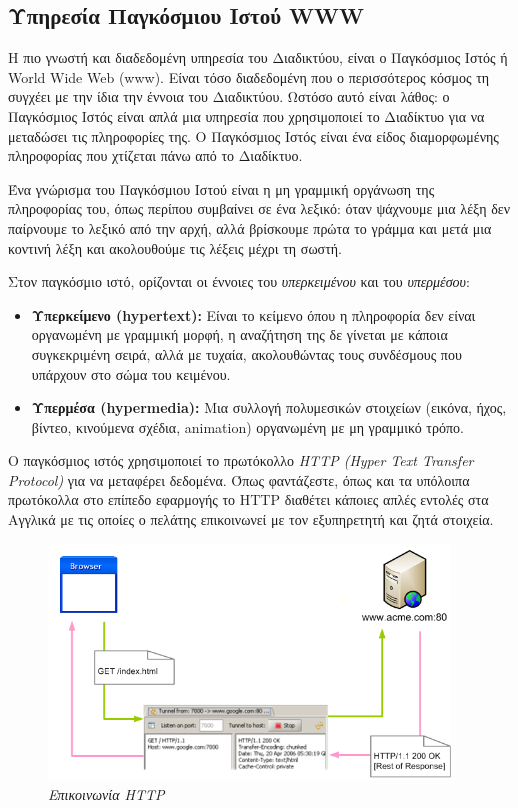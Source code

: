 %
%

\subsection{Υπηρεσία Παγκόσμιου Ιστού WWW}

Η πιο γνωστή και διαδεδομένη υπηρεσία του Διαδικτύου, είναι ο Παγκόσμιος Ιστός ή World Wide Web (www). Είναι τόσο διαδεδομένη που ο περισσότερος κόσμος τη συγχέει με την ίδια την έννοια του Διαδικτύου. Ωστόσο αυτό είναι λάθος: ο Παγκόσμιος Ιστός είναι απλά μια υπηρεσία που χρησιμοποιεί το Διαδίκτυο για να μεταδώσει τις πληροφορίες της. Ο Παγκόσμιος Ιστός είναι ένα είδος διαμορφωμένης πληροφορίας που χτίζεται πάνω από το Διαδίκτυο.

Ένα γνώρισμα του Παγκόσμιου Ιστού είναι η μη γραμμική οργάνωση της πληροφορίας του, όπως περίπου συμβαίνει σε ένα λεξικό: όταν ψάχνουμε μια λέξη δεν παίρνουμε το λεξικό από την αρχή, αλλά βρίσκουμε πρώτα το γράμμα και μετά μια κοντινή λέξη και ακολουθούμε τις λέξεις μέχρι τη σωστή.

Στον παγκόσμιο ιστό, ορίζονται οι έννοιες του \emph{υπερκειμένου} και του \emph{υπερμέσου}:

\begin{itemize}
\item \textbf{Υπερκείμενο (hypertext):} Είναι το κείμενο όπου  η πληροφορία δεν είναι οργανωμένη με γραμμική μορφή, η αναζήτηση της δε γίνεται με κάποια συγκεκριμένη σειρά, αλλά με τυχαία, ακολουθώντας τους συνδέσμους που υπάρχουν στο σώμα του κειμένου.
\item \textbf{Υπερμέσα (hypermedia):} Μια συλλογή πολυμεσικών στοιχείων (εικόνα, ήχος, βίντεο, κινούμενα σχέδια, animation) οργανωμένη με μη γραμμικό τρόπο.
\end{itemize}

Ο παγκόσμιος ιστός χρησιμοποιεί το πρωτόκολλο \emph{HTTP (Hyper Text Transfer Protocol)} για να μεταφέρει δεδομένα. Όπως φαντάζεστε, όπως και τα υπόλοιπα πρωτόκολλα στο επίπεδο εφαρμογής το HTTP διαθέτει κάποιες απλές εντολές στα Αγγλικά με τις οποίες ο πελάτης επικοινωνεί με τον εξυπηρετητή και ζητά στοιχεία.

\begin{figure}[!ht]
 \centering
 \includegraphics[width=0.95\textwidth]{images/chapter6/6-11}
 \caption {\textsl{Επικοινωνία HTTP}}
 \label{6-11}
\end{figure}

